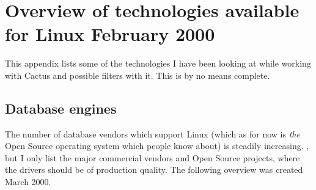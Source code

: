 
\chapter{Overview of technologies available for Linux February 2000}


This appendix lists some of the technologies I have been looking at
while working with Cactus and possible filters with it.   This is by
no means complete.







\section{Database engines}



The number of database vendors which support Linux (which as for now
is \textit{the} Open Source operating system which people know about)
is steadily increasing.  , but I only list the major
commercial vendors and Open Source projects, where the drivers should
be of production quality.  The following overview was created March
2000.

